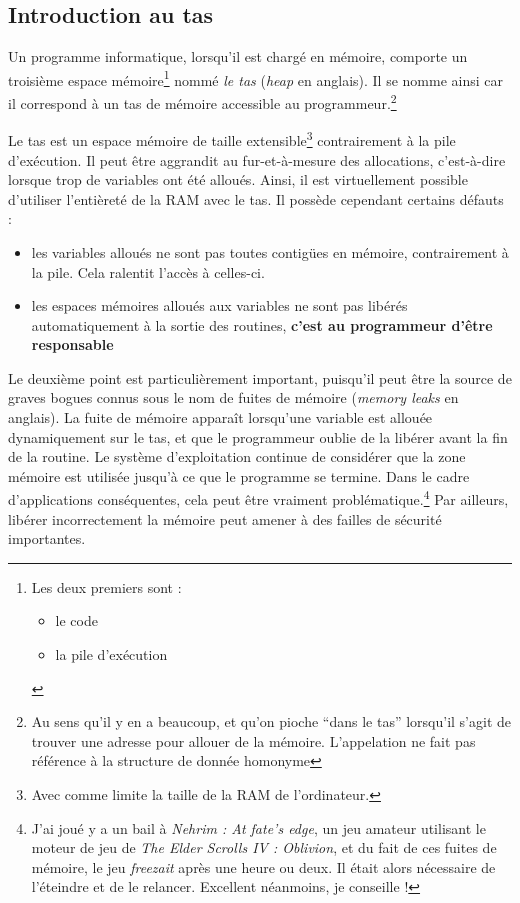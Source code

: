\documentclass[../../../main.tex]{subfiles}
\begin{document}
\subsection{Introduction au tas}
\label{sub:introduction_au_tas}
Un programme informatique, lorsqu'il est chargé en mémoire, comporte un troisième espace mémoire\footnote{Les deux premiers sont :\begin{itemize}
	\item le code
	\item la pile d'exécution
\end{itemize}} nommé \textit{le tas} (\textit{heap} en anglais). Il se nomme ainsi car il correspond à un tas de mémoire accessible au programmeur.\footnote{Au sens qu'il y en a beaucoup, et qu'on pioche ``dans le tas'' lorsqu'il s'agit de trouver une adresse pour allouer de la mémoire. L'appelation ne fait pas référence à la structure de donnée homonyme}
 
Le tas est un espace mémoire de taille extensible\footnote{Avec comme limite la taille de la RAM de l'ordinateur.} contrairement à la pile d'exécution. Il peut être aggrandit au fur-et-à-mesure des allocations, c'est-à-dire lorsque trop de variables ont été alloués. Ainsi, il est virtuellement possible d'utiliser l'entièreté de la RAM avec le tas. Il possède cependant certains défauts :
\begin{itemize}
	\item les variables alloués ne sont pas toutes contigües en mémoire, contrairement à la pile. Cela ralentit l'accès à celles-ci.
	\item les espaces mémoires alloués aux variables ne sont pas libérés automatiquement à la sortie des routines, \textbf{c'est au programmeur d'être responsable}
\end{itemize}
Le deuxième point est particulièrement important, puisqu'il peut être la source de graves bogues connus sous le nom de fuites de mémoire (\textit{memory leaks} en anglais). La fuite de mémoire apparaît lorsqu'une variable est allouée dynamiquement sur le tas, et que le programmeur oublie de la libérer avant la fin de la routine. Le système d'exploitation continue de considérer que la zone mémoire est utilisée jusqu'à ce que le programme se termine. Dans le cadre d'applications conséquentes, cela peut être vraiment problématique.\footnote{J'ai joué y a un bail à \textit{Nehrim : At fate's edge}, un jeu amateur utilisant le moteur de jeu de \textit{The Elder Scrolls IV : Oblivion}, et du fait de ces fuites de mémoire, le jeu \textit{freezait} après une heure ou deux. Il était alors nécessaire de l'éteindre et de le relancer. Excellent néanmoins, je conseille !} Par ailleurs, libérer incorrectement la mémoire peut amener à des failles de sécurité importantes.
 
\end{document}

